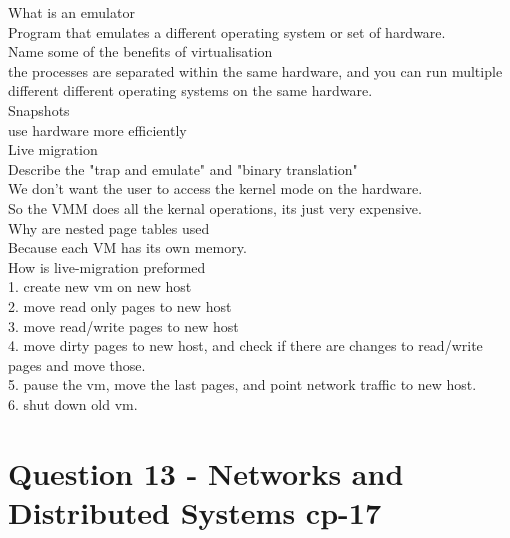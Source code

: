 \documentclass[a4paper,10pt,titlepage]{report}
\begin{document}
What is an emulator\\
	Program that emulates a different operating system or set of hardware.\\


Name some of the benefits of virtualisation\\
	the processes are separated within the same hardware, and you can run multiple different different operating systems on the same hardware.\\
		Snapshots\\
	use hardware more efficiently\\
	Live migration\\


Describe the "trap and emulate" and "binary translation"\\
	We don't want the user to access the kernel mode on the hardware.\\
	
	So the VMM does all the kernal operations, its just very expensive.\\

Why are nested page tables used\\
	Because each VM has its own memory.\\
		

How is live-migration preformed\\
	1. create new vm on new host\\
	2. move read only pages to new host\\
	3. move read/write pages to new host\\
	4. move dirty pages to new host, and check if there are changes to read/write pages and move those.\\
	5. pause the vm, move the last pages, and point network traffic to new host. \\
	6. shut down old vm. \\


\section{Question 13 -  Networks and Distributed Systems  cp-17 }
\end{document}
